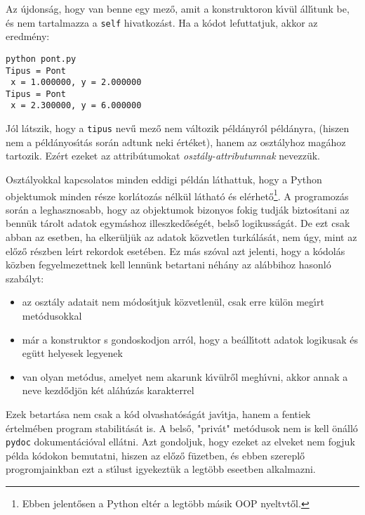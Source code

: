 \noindent Az \'ujdons\'ag, hogy van benne egy mez\H{o}, amit a konstruktoron k\'{\i}v\"ul \'all\'{\i}tunk 
be, \'es nem tartalmazza a {\tt self} hivatkoz\'ast. Ha a k\'odot lefuttatjuk, akkor az eredm\'eny:

\begin{Verbatim}[fontsize=\small]
python pont.py
Tipus = Pont
 x = 1.000000, y = 2.000000
Tipus = Pont
 x = 2.300000, y = 6.000000
\end{Verbatim}

\noindent J\'ol l\'atszik, hogy a {\tt tipus} nev\H{u} mez\H{o} nem v\'altozik p\'eld\'anyr\'ol 
p\'eld\'anyra, (hiszen nem a p\'eld\'anyos\'{\i}t\'as sor\'an adtunk neki \'ert\'eket), hanem 
az oszt\'alyhoz mag\'ahoz tartozik. Ez\'ert ezeket az attrib\'utumokat {\sl oszt\'aly-attributumnak}
 nevezz\"uk.

Oszt\'alyokkal kapcsolatos minden eddigi p\'eld\'an l\'athattuk, hogy a Python objektumok 
minden r\'esze korl\'atoz\'as n\'elk\"ul l\'athat\'o \'es el\'erhet\H{o}\footnote{Ebben 
jelent\H{o}sen a Python elt\'er a legt\"obb m\'asik OOP nyeltvt\H{o}l.}. A programoz\'as sor\'an 
a leghasznosabb, hogy az objektumok bizonyos fokig tudj\'ak biztos\'{\i}tani az benn\"uk 
t\'arolt adatok egym\'ashoz illeszked\H{o}s\'eg\'et, bels\H{o} logikuss\'ag\'at. De ezt 
csak abban az esetben, ha elker\"ulj\"uk az adatok k\"ozvetlen turk\'al\'as\'at, nem \'ugy, 
mint az el\H{o}z\H{o} r\'eszben le\'{\i}rt rekordok eset\'eben. Ez m\'as sz\'oval azt jelenti, 
hogy a k\'odol\'as k\"ozben fegyelmezettnek kell lenn\"unk betartani n\'eh\'any az al\'abbihoz 
hasonl\'o szab\'alyt:

\begin{itemize}
   \item{az oszt\'aly adatait nem m\'odos\'{\i}tjuk k\"ozvetlen\"ul, csak erre k\"ul\"on meg\'{\i}rt 
      met\'odusokkal}
   \item{m\'ar a konstruktor s gondoskodjon arr\'ol, hogy a be\'all\'{\i}tott adatok logikusak \'es 
      eg\"utt helyesek legyenek}
   \item{ van olyan met\'odus, amelyet nem akarunk k\'{\i}v\"ulr\H{o}l megh\'{\i}vni, akkor annak a 
      neve kezd\H{o}dj\"on k\'et al\'ah\'uz\'as karakterrel}   
\end{itemize}

\noindent Ezek betart\'asa nem csak a k\'od olvashat\'os\'ag\'at jav\'{\i}tja, hanem a fentiek 
\'ertel\-m\'e\-ben program stabilit\'as\'at is. A bels\H{o}, "priv\'at" met\'odusok nem is kell 
\"on\'all\'o {\tt pydoc} dokument\'aci\'oval ell\'atni. Azt gondoljuk, hogy ezeket az elveket nem 
fogjuk p\'elda k\'odokon bemutatni, hiszen az el\H{o}z\H{o} f\"uzetben, \'es ebben szerepl\H{o} 
progromjainkban ezt a st\'{\i}lust igyekezt\"uk a legt\"obb eseetben alkalmazni. 

